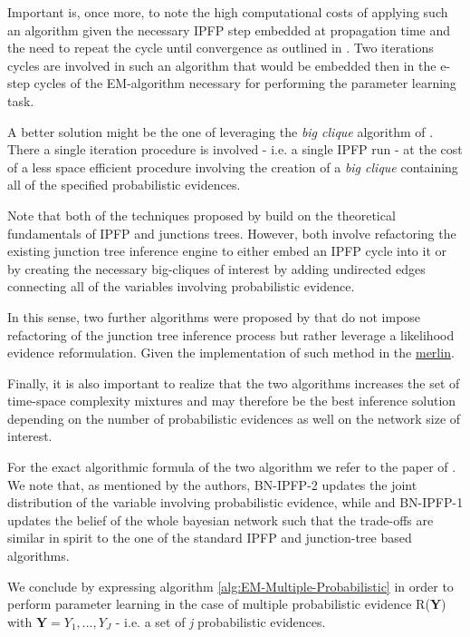 \documentclass[11pt]{article}
\begin{document}
\begin{article}
Important is, once more, to note the high computational
costs of applying such an algorithm given the necessary IPFP step
embedded at propagation time and the need to repeat the cycle until
convergence as outlined in \cite{Valtorta_2002}. Two iterations cycles are
involved in such an algorithm that would be embedded then in the e-step
cycles of the EM-algorithm necessary for performing the parameter learning task. 

A better solution might be the one of leveraging the \emph{big clique}
algorithm of \cite{Valtorta_2002}. There a single iteration procedure
is involved - i.e. a single IPFP run - at the cost of a less space
efficient procedure involving the creation of a \emph{big clique}
containing all of the specified probabilistic evidences.

Note that both of the techniques proposed by \cite{Valtorta_2002}
build on the theoretical fundamentals of IPFP and junctions
trees. However, both involve refactoring the existing junction tree
inference engine to either embed an IPFP cycle into it or by
creating the necessary big-cliques of interest by adding undirected
edges connecting all of the variables involving probabilistic
evidence.

In this sense, two further algorithms were proposed by
\cite{PENG_2010} that do not impose refactoring of the junction tree
inference process but rather leverage a likelihood evidence
reformulation. Given the implementation of such method in the
\href{https://github.com/radum2275/merlin}{merlin}.

Finally, it is also important to realize that the two algorithms
increases the set of time-space complexity mixtures and may
therefore be the best inference solution depending on the number of
probabilistic evidences as well on the network size of interest.

For the exact algorithmic formula of the two algorithm we refer to
the paper of \cite{PENG_2010}. We note that, as mentioned by the
authors, BN-IPFP-2 updates the joint distribution of the variable
involving probabilistic evidence, while and BN-IPFP-1 updates the
belief of the whole bayesian network such that the trade-offs are
similar in spirit to the one of the standard IPFP and junction-tree
based algorithms.

We conclude by expressing algorithm
\ref{alg:EM-Multiple-Probabilistic} in order to perform
parameter learning in the case of multiple probabilistic evidence
R(\textbf{Y}) with \(\textbf{Y} = {Y_1, ..., Y_J}\) - i.e. a set of \emph{j}
probabilistic evidences.


\end{article}
\end{document}
